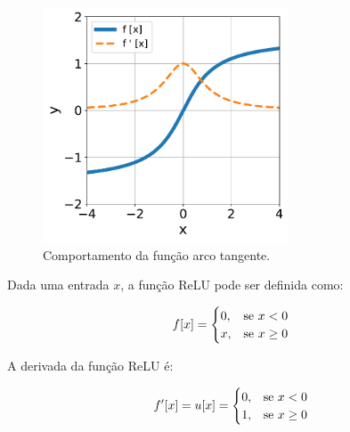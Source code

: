 \begin{figure}[H]
    \centering
    \includegraphics[width=0.65\textwidth]{figs/ann_arctan_function.pdf}

    \caption{Comportamento da função arco tangente.}
    \label{fig:ann_arctan_function}
\end{figure}


\linebreak
\newpage


\begin{definition}
    Dada uma entrada $x$, a função ReLU pode ser definida como:

    \begin{equation}
        f[x] =  
        \begin{cases}
            0, & \text{se $x < 0$}\\
            x, & \text{se $x \geq 0$}
        \end{cases}
        \vspace{0.2cm}
        \label{eq:ann_relu_function}
    \end{equation}

    A derivada da função ReLU é:

    \begin{equation}
        f'[x] = u[x] = 
        \begin{cases}
            0, & \text{se $x < 0$}\\
            1, & \text{se $x \geq 0$}
        \end{cases}
        \vspace{0.2cm}
        \label{eq:ann_relu_function_dy}
    \end{equation}

\end{definition}

